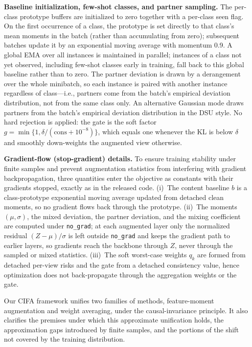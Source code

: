 \documentclass[electronics,article,submit,moreauthors]{Definitions/mdpi}
\newcommand{\add}[1]{\textcolor{addblue}{#1}}
\def\add#1{#1}%
\renewcommand{\add}[1]{#1}
\begin{document}
\add{\noindent\textbf{Baseline initialization, few-shot classes, and partner sampling.} The per-class prototype buffers are initialized to zero together with a per-class seen flag. On the first occurrence of a class, the prototype is set directly to that class's mean moments in the batch (rather than accumulating from zero); subsequent batches update it by an exponential moving average with momentum 0.9. A global EMA over all instances is maintained in parallel; instances of a class not yet observed, including few-shot classes early in training, fall back to this global baseline rather than to zero. The partner deviation is drawn by a derangement over the whole minibatch, so each instance is paired with another instance regardless of class---i.e., partners come from the batch's empirical deviation distribution, not from the same class only. An alternative Gaussian mode draws partners from the batch's empirical deviation distribution in the DSU style. No hard rejection is applied: the gate is the soft factor $g=\min\{1,\delta/(\mathrm{cons}+10^{-8})\}$, which equals one whenever the KL is below $\delta$ and smoothly down-weights the augmented view otherwise.}

\noindent\textbf{Gradient-flow (stop-gradient) details.} To ensure training stability under finite samples and prevent augmentation statistics from interfering with gradient backpropagation, three quantities enter the objective as constants with their gradients stopped, exactly as in the released code. (i)~The content baseline $b$ is a class-prototype exponential moving average updated from detached clean moments, so no gradient flows back through the prototype. (ii)~The moments $(\mu,\sigma)$, the mixed deviation, the partner deviation, and the mixing coefficient are computed under \texttt{no\_grad}; at each augmented layer only the normalized residual $(Z-\mu)/\sigma$ is left outside \texttt{no\_grad} and keeps the gradient path to earlier layers, so gradients reach the backbone through $Z$, never through the sampled or mixed statistics. (iii)~The soft worst-case weights $q_k$ are formed from detached per-view risks and the gate from a detached consistency value, hence optimization does not back-propagate through the aggregation weights or the gate.

Our CIFA framework unifies two families of methods, feature-moment augmentation and weight averaging, under the causal-invariance principle. It also clarifies the premises under which this approximate unification holds, the approximation gaps introduced by finite samples, and the portions of the shift not covered by the training distribution.
\end{document}
